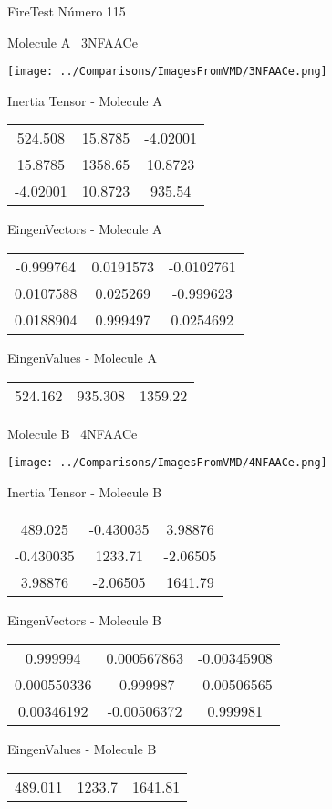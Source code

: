 \vtab[-3cm]
\begin{center}
{\large FireTest \tab Número 115}
\end{center}
\begin{multicols}{2}
\begin{center}

Molecule A \
3NFAACe

\texttt{[image: ../Comparisons/ImagesFromVMD/3NFAACe.png]}

Inertia Tensor - Molecule A \\
\begin{tabular}{|c c c|}
524.508	 & 	15.8785	 & 	-4.02001	 \\
15.8785	 & 	1358.65	 & 	10.8723	 \\
-4.02001	 & 	10.8723	 & 	935.54
\end{tabular}

\vtab
 EingenVectors - Molecule A     \\
\begin{tabular}{|c c c|}
-0.999764	 & 	0.0191573	 & 	-0.0102761	 \\
0.0107588	 & 	0.025269	 & 	-0.999623	 \\
0.0188904	 & 	0.999497	 & 	0.0254692
\end{tabular}

\vtab
 EingenValues - Molecule A     \\
\begin{tabular}{|c c c|}
524.162	 & 	935.308	 & 	1359.22	 \\
\end{tabular}
\columnbreak

Molecule B \
4NFAACe

\texttt{[image: ../Comparisons/ImagesFromVMD/4NFAACe.png]}

Inertia Tensor - Molecule B \\
\begin{tabular}{|c c c|}
489.025	 & 	-0.430035	 & 	3.98876	 \\
-0.430035	 & 	1233.71	 & 	-2.06505	 \\
3.98876	 & 	-2.06505	 & 	1641.79
\end{tabular}

\vtab
 EingenVectors - Molecule B     \\
\begin{tabular}{|c c c|}
0.999994	 & 	0.000567863	 & 	-0.00345908	 \\
0.000550336	 & 	-0.999987	 & 	-0.00506565	 \\
0.00346192	 & 	-0.00506372	 & 	0.999981
\end{tabular}

\vtab
 EingenValues - Molecule B     \\
\begin{tabular}{|c c c|}
489.011	 & 	1233.7	 & 	1641.81	 \\
\end{tabular}

\end{center}
\end{multicols}

